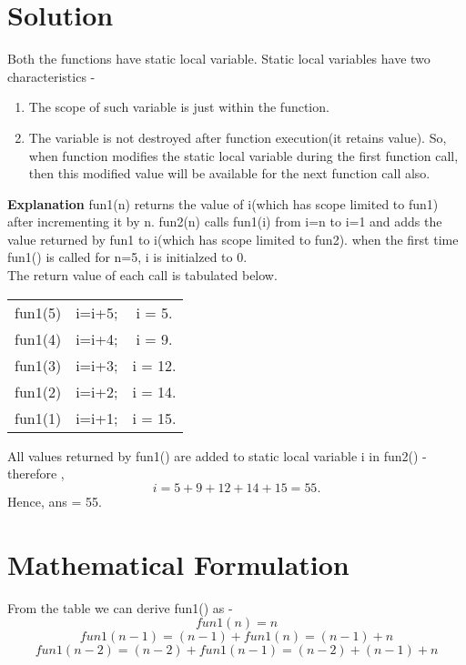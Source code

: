 \documentclass[journal,12pt,twocolumn]{IEEEtran}
\begin{document}
\section{Solution}
Both the functions have static local variable. Static local variables have two characteristics  - 
\begin{enumerate}
    \item The scope of such variable is just within the function.
    \item The variable is not destroyed after function execution(it retains value). So, when function modifies the static local variable during the first function call, then this modified value will be available for the next function call also.
\end{enumerate}
\textbf{Explanation}
fun1(n) returns the value of i(which has scope limited to fun1) after incrementing it by n.
\newline
fun2(n) calls fun1(i) from i=n to i=1 and adds the value returned by fun1 to i(which has scope limited to fun2).
\newline
when the first time fun1() is called for n=5, i is initialzed to 0. \\
The return value of each call is tabulated below.
\begin{center}
\begin{tabular}{ |c|c|c| } 
 \hline
fun1(5)  & i=i+5; & i = 5. \\
fun1(4)  & i=i+4; & i = 9. \\
fun1(3)  & i=i+3; & i = 12. \\
fun1(2)  & i=i+2; & i = 14. \\
fun1(1)  & i=i+1; & i = 15. \\
 \hline
\end{tabular}
\end{center}
All values returned by fun1() are added to static local variable i in fun2() - 
\newline
therefore ,
\newline
\begin{equation*}
i = 5+9+12+14+15 = 55.
\end{equation*}
Hence, ans = 55.

\section{Mathematical Formulation}
From the table we can derive fun1() as -
\begin{equation*}
fun1(n) = n 
\end{equation*}
\begin{equation*}
fun1(n-1) = (n-1) + fun1(n) = (n-1) + n 
\end{equation*}
\begin{equation*}
fun1(n-2) = (n-2) + fun1(n-1) = (n-2) + (n-1) + n
\end{equation*}
\end{document}
